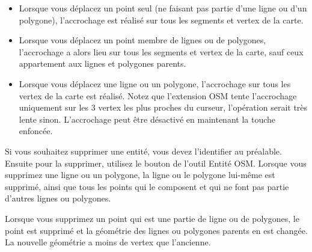 \begin{itemize}[label=--]
\item Lorsque vous déplacez un point seul (ne faisant pas partie d'une ligne ou d'un polygone), l'accrochage est réalisé sur tous les segments et vertex de la carte.
\item Lorsque vous déplacez un point membre de lignes ou de polygones, l'accrochage a alors lieu sur tous les segments et vertex de la carte, sauf ceux appartement aux lignes et polygones parents.
\item Lorsque vous déplacez une ligne ou un polygone, l'accrochage sur tous les vertex de la carte est réalisé. Notez que l'extension OSM tente l'accrochage uniquement sur les 3 vertex les plus proches du curseur, l'opération serait très lente sinon. L'accrochage peut être désactivé en maintenant la touche  enfoncée.
\end{itemize}


Si vous souhaitez supprimer une entité, vous devez l'identifier au préalable. Ensuite pour la supprimer, utilisez le bouton  de l'outil Entité OSM. Lorsque vous supprimez une ligne ou un polygone, la ligne ou le polygone lui-même est supprimé, ainsi que tous les points qui le composent et qui ne font pas partie d'autres lignes ou polygones.

Lorsque vous supprimez un point qui est une partie de ligne ou de polygones, le point est supprimé et la géométrie des lignes ou polygones parents en est changée. La nouvelle géométrie a moins de vertex que l'ancienne.

